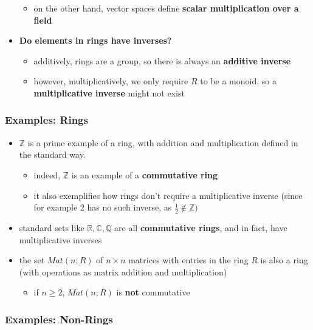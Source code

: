 \documentclass{exam}
\begin{document}
\begin{itemize}
\begin{itemize}
        \item on the other hand, vector spaces define \textbf{scalar multiplication over a field}
    \end{itemize}
    \item \textbf{Do elements in rings have inverses?}
    \begin{itemize}
        \item additively, rings are a group, so there is always an \textbf{additive inverse}
        \item however, multiplicatively, we only require $R$ to be a monoid, so a \textbf{multiplicative inverse} might not exist
    \end{itemize}
\end{itemize}

\subsubsection{Examples: Rings}

\begin{itemize}
    \item $\mathbb{Z}$ is a prime example of a ring, with addition and multiplication defined in the standard way.
    \begin{itemize}
        \item indeed, $\mathbb{Z}$ is an example of a \textbf{commutative ring}
        \item it also exemplifies how rings don't require a multiplicative inverse (since for example 2 has no such inverse, as $\frac{1}{2} \not\in \mathbb{Z})$
    \end{itemize}
    \item standard sets like $\mathbb{R}, \mathbb{C}, \mathbb{Q}$ are all \textbf{commutative rings}, and in fact, have multiplicative inverses
    \item the set $Mat(n; R)$ of $n \times n$ matrices with entries in the ring $R$ is also a ring (with operations as matrix addition and multiplication)
    \begin{itemize}
        \item if $n \geq 2$, $Mat(n; R)$ is \textbf{not} commutative
    \end{itemize}
    
\end{itemize}

\subsubsection{Examples: Non-Rings}
\end{document}
